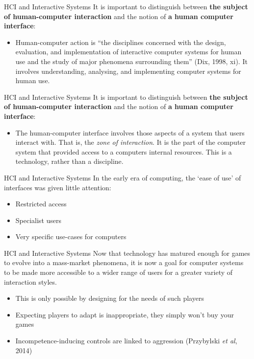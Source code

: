 \begin{frame}{HCI and Interactive Systems}
	It is important to distinguish between \textbf{the subject of human-computer interaction} and the notion of
	\textbf{a human computer interface}:
	
	\begin{itemize}
		\item Human-computer action is ``the disciplines concerned with the design, evaluation, 
		and implementation of interactive computer systems for human use and the study of major phenomena
		surrounding them'' (Dix, 1998, xi). It involves understanding, analysing, and implementing computer
		systems for human use.
	\end{itemize}
\end{frame}

\begin{frame}{HCI and Interactive Systems}
	It is important to distinguish between \textbf{the subject of human-computer interaction} and the notion of
	\textbf{a human computer interface}:
	
	\begin{itemize}
		\item The human-computer interface involves those aspects of a system that users interact with. That is,
		the \textit{zone of interaction}. It is the part of the computer system that provided access to a computers
		internal resources. This is a technology, rather than a discipline.
	\end{itemize}
\end{frame}

\begin{frame}{HCI and Interactive Systems}
	In the early era of computing, the `ease of use' of interfaces was given little attention:
	
	\begin{itemize}
		\item Restricted access
		\item Specialist users
		\item Very specific use-cases for computers
	\end{itemize}
\end{frame}

\begin{frame}{HCI and Interactive Systems}
	Now that technology has matured enough for games to evolve into a mass-market phenomena, it is now a goal for
	computer systems to be made more accessible to a wider range of users for a greater variety of interaction styles. 
	
	\begin{itemize}
		\item This is only possible by designing for the needs of such players
		\item Expecting players to adapt is inappropriate, they simply won't buy your games
		\item Incompetence-inducing controls are linked to aggression (Przybylski \textit{et al}, 2014)
	\end{itemize}
\end{frame}

